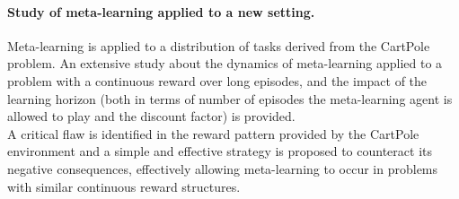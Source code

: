 \paragraph{Study of meta-learning applied to a new setting.} Meta-learning is applied
to a distribution of tasks derived from the CartPole problem. An extensive
study about the dynamics of meta-learning applied to a problem with a continuous
reward over long episodes, and the impact of the learning horizon (both
in terms of number of episodes the meta-learning agent is allowed to play
and the discount factor) is provided. \\

A critical flaw is identified in the reward pattern provided by the CartPole
environment and a simple and effective strategy is proposed to counteract its
negative consequences, effectively allowing meta-learning to occur in
problems with similar continuous reward structures.
